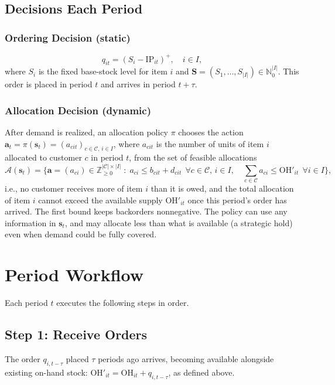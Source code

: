 \documentclass[11pt, a4paper]{article}
\theoremstyle{definition}
\theoremstyle{remark}
\newcommand{\IP}{\text{IP}}
\newcommand{\OH}{\text{OH}}
\begin{document}
\subsection{Decisions Each Period}

\subsubsection{Ordering Decision (static)}
\begin{equation}
    q_{it} = (S_i - \IP_{it})^+, \quad i \in I,
\end{equation}
where $S_i$ is the fixed base-stock level for item $i$ and $\mathbf{S} = (S_1, \ldots, S_{|I|}) \in \mathbb{N}_0^{|I|}$. This order is placed in period $t$ and arrives in period $t+\tau$.

\subsubsection{Allocation Decision (dynamic)}
After demand is realized, an allocation policy $\pi$ chooses the action $\mathbf{a}_t = \pi(\mathbf{s}_t) = (a_{cit})_{c \in \mathcal{C},\, i \in I}$, where $a_{cit}$ is the number of units of item $i$ allocated to customer $c$ in period $t$, from the set of feasible allocations
\begin{equation}
    \mathcal{A}(\mathbf{s}_t) = \Big\{ \mathbf{a} = (a_{ci}) \in \mathbb{Z}_{\geq 0}^{|\mathcal{C}| \times |I|} \;:\; a_{ci} \leq b_{cit} + d_{cit} \ \ \forall c \in \mathcal{C},\, i \in I, \quad \sum_{c \in \mathcal{C}} a_{ci} \leq \OH'_{it} \ \ \forall i \in I \Big\},
\end{equation}
i.e., no customer receives more of item $i$ than it is owed, and the total allocation of item $i$ cannot exceed the available supply $\OH'_{it}$ once this period's order has arrived. The first bound keeps backorders nonnegative. The policy can use any information in $\mathbf{s}_t$, and may allocate less than what is available (a strategic hold) even when demand could be fully covered.

\newpage
\section{Period Workflow}
\label{sec:workflow}

Each period $t$ executes the following steps in order.

\subsection{Step 1: Receive Orders}
The order $q_{i,t-\tau}$ placed $\tau$ periods ago arrives, becoming available alongside existing on-hand stock: $\OH'_{it} = \OH_{it} + q_{i,t-\tau}$, as defined above.
\end{document}
